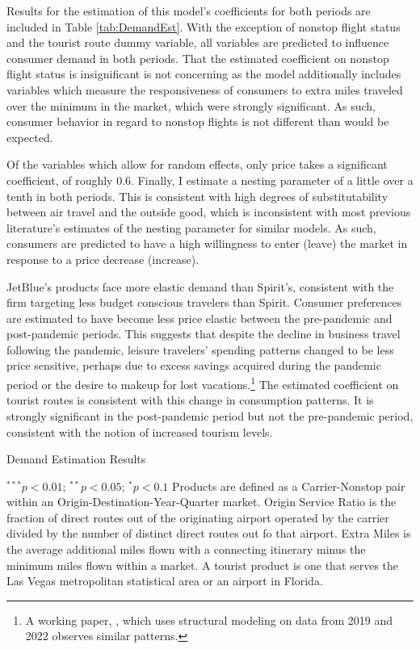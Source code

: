 \documentclass{article}
\begin{document}
    Results for the estimation of this model's coefficients for both periods are included in Table \ref{tab:DemandEst}. With the exception of nonstop flight status and the tourist route dummy variable, all variables are predicted to influence consumer demand in both periods. That the estimated coefficient on nonstop flight status is insignificant is not concerning as the model additionally includes variables which measure the responsiveness of consumers to extra miles traveled over the minimum in the market, which were strongly significant. As such, consumer behavior in regard to nonstop flights is not different than would be expected.  
    
    Of the variables which allow for random effects, only price takes a significant coefficient, of roughly $0.6$. Finally, I estimate a nesting parameter of a little over a tenth in both periods. This is consistent with high degrees of substitutability between air travel and the outside good, which is inconsistent with most previous literature's estimates of the nesting parameter for similar models. As such, consumers are predicted to have a high willingness to enter (leave) the market in response to a price decrease (increase).

     JetBlue's products face more elastic demand than Spirit's, consistent with the firm targeting less budget conscious travelers than Spirit. Consumer preferences are estimated to have become less price elastic between the pre-pandemic and post-pandemic periods. This suggests that despite the decline in business travel following the pandemic, leisure travelers' spending patterns changed to be less price sensitive, perhaps due to excess savings acquired during the pandemic period or the desire to makeup for lost vacations.\footnote{A working paper, \citet{ewen_zoom_2023}, which uses structural modeling on data from 2019 and 2022 observes similar patterns.}  The estimated coefficient on tourist routes is consistent with this change in consumption patterns.  It is strongly significant in the post-pandemic period but not the pre-pandemic period, consistent with the notion of increased tourism levels. 
    
    \begin{table}
        \caption{Demand Estimation Results}
        \label{tab:DemandEst}
        \vspace{-15mm}
        \begin{center}
           
        \end{center}
        \vspace{-5mm}
                \footnotesize{$^{***}p<0.01$; $^{**}p<0.05$; $^{*}p<0.1$ Products are defined as a Carrier-Nonstop pair within an Origin-Destination-Year-Quarter market. Origin Service Ratio is the fraction of direct routes out of the originating airport operated by the carrier divided by the number of distinct direct routes out fo that airport. Extra Miles is the average additional miles flown with a connecting itinerary minus the minimum miles flown within a market.  A tourist product is one that serves the Las Vegas metropolitan statistical area or an airport in Florida.}

    \end{table}
		
\end{document}
